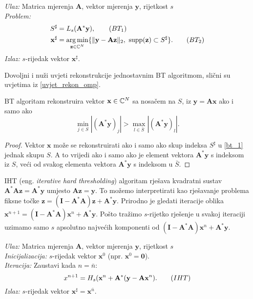 \documentclass[a4paper,twoside,12pt]{memoir} %
\newcommand{\vect}[1]{\mathbf{#1}}
\renewcommand{\vec}{\vect}
\newcommand{\supp}{\text{\normalfont{supp}}}
\newcommand{\norm}[1]{\|{#1}\|}
\DeclareMathOperator*{\argmin}{arg\,min}
\newenvironment{alg}[1]
{
    \bigskip
    \begin{tcolorbox}[arc=0mm,boxrule=1.2pt,colframe=black,colback=white,detach title, before upper={\medskip\begin{center}\textbf{#1}\end{center}\hline\newline\medskip},frame hidden]
    \medskip
}
{
    \medskip
\end{tcolorbox}
    \bigskip
}
\begin{document}
\begin{alg}{BT}
    \textit{Ulaz:} Matrica mjerenja $\vec A$, vektor mjerenja $\vec y$, rijetkost $s$ \\
    \textit{Problem:}
        \begin{align*}
            S^{\sharp} &= L_s(\vec A^* \vec y),\tag{$BT_1$}\label{bt_1}\\
            \vec x^{\sharp} &= \argmin_{\vec z \in \C^N}\{\norm{\vec y - \vec{Az}}_2,\ \supp(\vec z) \subset S^{\sharp}\}.\tag{$BT_2$}\label{bt_2}\\
        \end{align*}
        \textit{Izlaz:} $s$-rijedak vektor $\vec x^{\sharp}$.
\end{alg}

\noindent Dovoljni i nu\v{z}i uvjeti rekonstrukcije jednostavnim BT algoritmom, sli\v{c}ni su uvjetima iz \eqref{uvjet_rekon_omp}.
\begin{prop}\label{prop:3:7}
    BT algoritam rekonstruira vektor $\vec x \in \C^N$ sa nosa\v{c}em na $S$, iz $\vec y = \vec{Ax}$ ako i samo ako
    \begin{equation}\label{bt_uvjet}
        \min_{j \in S}|(\vec A^* \vec y)_j| > \max_{l \in \bar{S}} |(\vec A^* \vec y)_l| .
    \end{equation}
\end{prop}
\begin{proof}
    Vektor $\vec x$ mo\v{z}e se rekonstruirati ako i samo ako skup indeksa $S^{\sharp}$ u \eqref{bt_1} jednak skupu $S$. A to vrijedi ako i samo ako je element vektora $\vec A^* \vec y$ s indeksom iz $S$, ve\'ci od svakog elementa vektora $\vec A^* \vec y$ s indeksom u $\bar{S}$.
\end{proof}
\indent
IHT (eng. \textit{iterative hard thresholding}) algoritam rje\v{s}ava kvadratni sustav $\vec A^* \vec A \vec z= \vec A^* \vec y$ umjesto $\vec{Az}=\vec y$. To mo\v{z}emo interpretirati kao rje\v{s}avanje problema fiksne to\v{c}ke $\vec z = (\vec{I}- \vec A^* \vec A ) \vec z + \vec A^* \vec y$. Prirodno je gledati iteracije oblika $\vec x^{n+1} = (\vec{I}- \vec A^* \vec A) \vec x^n + \vec A^* \vec y$. Po\v{s}to tra\v{z}imo $s$-rijetko rje\v{s}enje u svakoj iteraciji uzimamo samo $s$ apsolutno najve\'cih komponenti od $(\vec{I} - \vec A^* \vec A ) \vec x^n + \vec A^* \vec y$.

\begin{alg}{IHT}
    \textit{Ulaz:} Matrica mjerenja $\vec A$, vektor mjerenja $\vec y$, rijetkost $s$ \\
    \textit{Inicijalizacija:} $s$-rijedak vektor $\vec x^0$ (npr. $\vec x^0 = \vec 0$).\\
    \textit{Iteracija:} Zaustavi kada $n = \bar{n}$:
        \begin{equation}
            x^{n+1} = H_s(\vec x^n + \vec A^* (\vec y - \vec{Ax}^n).\tag{$IHT$}\label{iht}\\
        \end{equation}
        \textit{Izlaz:} $s$-rijedak vektor $\vec x^{\sharp}=\vec x^{\bar n}$.
\end{alg}
\end{document}
